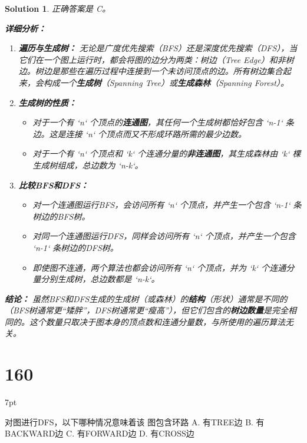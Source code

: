 \documentclass[UTF8]{report}
\newtheorem{solution}{Solution}
\theoremstyle{MyLineTheoremStyle} %
\theoremstyle{MyBlockTheoremStyle} %
\theoremstyle{MySubsubsectionStyle} %
\newenvironment{graybox}{%
        \def\FrameCommand{%
        \hspace{1pt}%
        {\color{gray}\small \vrule width 2pt}%
        {\color{graybox_color}\vrule width 4pt}%
        \colorbox{graybox_color}%
        }%
        \MakeFramed{\advance\hsize-\width\FrameRestore}%
        \noindent\hspace{-4.55pt}%
        \begin{adjustwidth}{}{7pt}%
        \vspace{2pt}\vspace{2pt}%
        }
        {%
        \vspace{2pt}\end{adjustwidth}\endMakeFramed%
        }
\begin{document}
\begin{solution}
正确答案是 C。

\textbf{详细分析：}

\begin{enumerate}
    \item \textbf{遍历与生成树：}
    无论是广度优先搜索（BFS）还是深度优先搜索（DFS），当它们在一个图上运行时，都会将图的边分为两类：树边（Tree Edge）和非树边。树边是那些在遍历过程中连接到一个未访问顶点的边。所有树边集合起来，会构成一个\textbf{生成树}（Spanning Tree）或\textbf{生成森林}（Spanning Forest）。

    \item \textbf{生成树的性质：}
    \begin{itemize}
        \item 对于一个有 `n` 个顶点的\textbf{连通图}，其任何一个生成树都恰好包含 `n-1` 条边。这是连接 `n` 个顶点而又不形成环路所需的最少边数。
        \item 对于一个有 `n` 个顶点和 `k` 个连通分量的\textbf{非连通图}，其生成森林由 `k` 棵生成树组成，总边数为 `n-k`。
    \end{itemize}

    \item \textbf{比较BFS和DFS：}
    \begin{itemize}
        \item 对一个连通图运行BFS，会访问所有 `n` 个顶点，并产生一个包含 `n-1` 条树边的BFS树。
        \item 对同一个连通图运行DFS，同样会访问所有 `n` 个顶点，并产生一个包含 `n-1` 条树边的DFS树。
        \item 即使图不连通，两个算法也都会访问所有 `n` 个顶点，并为 `k` 个连通分量分别生成树，总边数都是 `n-k`。
    \end{itemize}
\end{enumerate}

\textbf{结论：}
虽然BFS和DFS生成的生成树（或森林）的\textbf{结构}（形状）通常是不同的（BFS树通常更“矮胖”，DFS树通常更“瘦高”），但它们包含的\textbf{树边数量}是完全相同的。这个数量只取决于图本身的顶点数和连通分量数，与所使用的遍历算法无关。
\end{solution}

\section*{160}
\begin{graybox}
对图进行DFS，以下哪种情况意味着该
图包含环路
A. 有TREE边
B. 有BACKWARD边
C. 有FORWARD边
D. 有CROSS边
\end{graybox}
\end{document}
